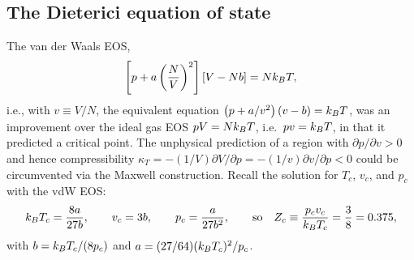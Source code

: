 \subsection{The Dieterici equation of state}

The van der Waals EOS,
\begin{equation}
  \left[p + a\left(\frac{N}{V}\right)^2\right]\left[V-Nb\right] = Nk_{B} T,
\end{equation}
i.e., with $v\equiv V/N$, the equivalent equation $\left(p + a/v^2\right)(v-b) = k_{B} T$, was an improvement over the
ideal gas EOS $pV = Nk_{B} T$, i.e.\ $pv = k_{B} T$, in that it predicted a critical point. The unphysical prediction of
a region with $\partial p/\partial v>0$ and hence compressibility
$\kappa_T = -(1/V)\partial V/\partial p = -(1/v)\partial v/\partial p<0$ could be circumvented via
the Maxwell construction. Recall the solution for $T_c$, $v_c$, and $p_c$ with the vdW EOS:
\begin{equation}
  k_{B} T_c = \frac{8a}{27b},\qquad v_c = 3b,\qquad p_c = \frac{a}{27b^2},\qquad\text{so}\quad
  Z_c\equiv\frac{p_cv_c}{k_{B} T_c} = \frac{3}{8} = 0.375,
\end{equation}
with $b = k_{B} T_c/(8p_c)$ and $a = (27/64)(k_{B} T_c)^2/p_c$.

